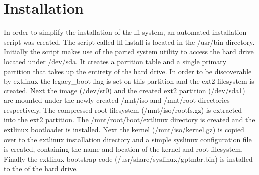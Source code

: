 \section{Installation}\label{Installation}

In order to simplify the installation of the \gls{lfl} system, an automated installation script was created. The script called lfl-install is located in the /usr/bin directory. Initially the script makes use of the parted system utility to access the hard drive located under /dev/sda. It creates a  partition table and a single primary partition that takes up the entirety of the hard drive. In order to be discoverable by extlinux the legacy\_boot flag is set on this partition and the ext2 filesystem is created. Next the  image (/dev/sr0) and the created ext2 partition (/dev/sda1) are mounted under the newly created /mnt/iso and /mnt/root directories respectively. The compressed root filesystem (/mnt/iso/rootfs.gz) is extracted into the ext2 partition. The /mnt/root/boot/extlinux directory is created and the extlinux bootloader is installed. Next the kernel (/mnt/iso/kernel.gz) is copied over to the extlinux installation directory and a simple syslinux configuration file is created, containing the name and location of the kernel and root filesystem. Finally the extlinux bootstrap code (/usr/share/syslinux/gptmbr.bin) is installed to the  of the hard drive.
